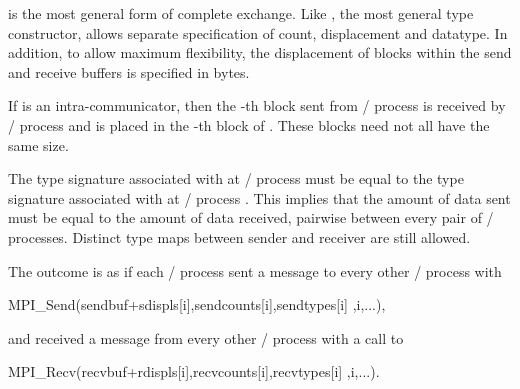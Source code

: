 
is the most general form of complete exchange.
Like , the most general type constructor,
 allows separate specification of count,
displacement and datatype.  In addition, to allow maximum flexibility,
the displacement of blocks within the send and receive buffers is
specified in bytes.

If  is an intra-communicator, then
the -th block sent from \MPI/ process  is received by \MPI/ process
 and is placed in the -th block of .
These blocks need not all have the same size.

The type signature associated with
 at \MPI/ process  must be equal
to the type signature
associated with  at \MPI/ process .
This implies that the amount of data sent must be equal to the
amount of data received, pairwise between every pair of \MPI/ processes.
Distinct type maps between sender and receiver are still allowed.

The outcome is as if each \MPI/ process sent a message to every other \MPI/ process with
\begin{mpicodeblock}
MPI\_Send(sendbuf+sdispls[i],sendcounts[i],sendtypes[i] ,i,...),
\end{mpicodeblock}
\noindent and received a message from every other \MPI/ process with a call to
\begin{mpicodeblock}
MPI\_Recv(recvbuf+rdispls[i],recvcounts[i],recvtypes[i] ,i,...).
\end{mpicodeblock}

